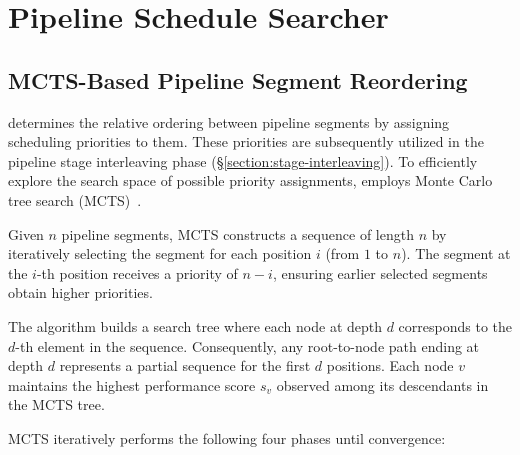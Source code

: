 \section{Pipeline Schedule Searcher}
\label{section:pipeline-schedule-searcher}

\subsection{MCTS-Based Pipeline Segment Reordering}
\label{section:segment-reordering}

\sys{} determines the relative ordering between pipeline segments by assigning scheduling priorities to them.
These priorities are subsequently utilized in the pipeline stage interleaving phase (\S\ref{section:stage-interleaving}).
To efficiently explore the search space of possible priority assignments, \sys{} employs Monte Carlo tree search (MCTS)~\cite{mcts}.

Given $n$ pipeline segments, MCTS constructs a sequence of length $n$ by iteratively selecting the segment for each position $i$ (from $1$ to $n$).
The segment at the $i$-th position receives a priority of $n - i$, ensuring earlier selected segments obtain higher priorities.

The algorithm builds a search tree where each node at depth $d$ corresponds to the $d$-th element in the sequence.
Consequently, any root-to-node path ending at depth $d$ represents a partial sequence for the first $d$ positions.
Each node $v$ maintains the highest performance score $s_v$ observed among its descendants in the MCTS tree.

MCTS iteratively performs the following four phases until convergence:

